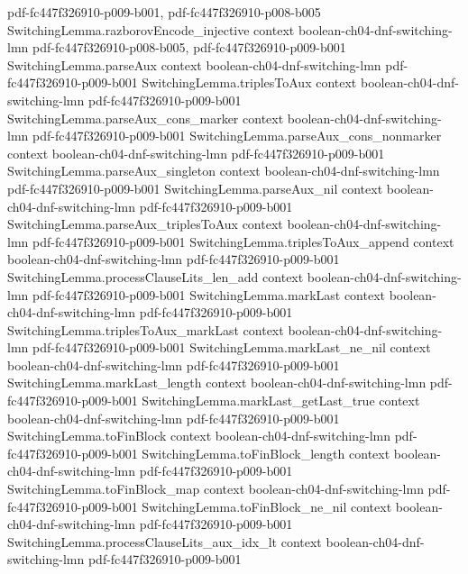 \begin{theorem}
  {pdf-fc447f326910-p009-b001,
    pdf-fc447f326910-p008-b005}
\proofstep
  {SwitchingLemma.razborovEncode_injective}
  {context}
  {boolean-ch04-dnf-switching-lmn}
  {pdf-fc447f326910-p008-b005,
    pdf-fc447f326910-p009-b001}
\proofstep
  {SwitchingLemma.parseAux}
  {context}
  {boolean-ch04-dnf-switching-lmn}
  {pdf-fc447f326910-p009-b001}
\proofstep
  {SwitchingLemma.triplesToAux}
  {context}
  {boolean-ch04-dnf-switching-lmn}
  {pdf-fc447f326910-p009-b001}
\proofstep
  {SwitchingLemma.parseAux_cons_marker}
  {context}
  {boolean-ch04-dnf-switching-lmn}
  {pdf-fc447f326910-p009-b001}
\proofstep
  {SwitchingLemma.parseAux_cons_nonmarker}
  {context}
  {boolean-ch04-dnf-switching-lmn}
  {pdf-fc447f326910-p009-b001}
\proofstep
  {SwitchingLemma.parseAux_singleton}
  {context}
  {boolean-ch04-dnf-switching-lmn}
  {pdf-fc447f326910-p009-b001}
\proofstep
  {SwitchingLemma.parseAux_nil}
  {context}
  {boolean-ch04-dnf-switching-lmn}
  {pdf-fc447f326910-p009-b001}
\proofstep
  {SwitchingLemma.parseAux_triplesToAux}
  {context}
  {boolean-ch04-dnf-switching-lmn}
  {pdf-fc447f326910-p009-b001}
\proofstep
  {SwitchingLemma.triplesToAux_append}
  {context}
  {boolean-ch04-dnf-switching-lmn}
  {pdf-fc447f326910-p009-b001}
\proofstep
  {SwitchingLemma.processClauseLits_len_add}
  {context}
  {boolean-ch04-dnf-switching-lmn}
  {pdf-fc447f326910-p009-b001}
\proofstep
  {SwitchingLemma.markLast}
  {context}
  {boolean-ch04-dnf-switching-lmn}
  {pdf-fc447f326910-p009-b001}
\proofstep
  {SwitchingLemma.triplesToAux_markLast}
  {context}
  {boolean-ch04-dnf-switching-lmn}
  {pdf-fc447f326910-p009-b001}
\proofstep
  {SwitchingLemma.markLast_ne_nil}
  {context}
  {boolean-ch04-dnf-switching-lmn}
  {pdf-fc447f326910-p009-b001}
\proofstep
  {SwitchingLemma.markLast_length}
  {context}
  {boolean-ch04-dnf-switching-lmn}
  {pdf-fc447f326910-p009-b001}
\proofstep
  {SwitchingLemma.markLast_getLast_true}
  {context}
  {boolean-ch04-dnf-switching-lmn}
  {pdf-fc447f326910-p009-b001}
\proofstep
  {SwitchingLemma.toFinBlock}
  {context}
  {boolean-ch04-dnf-switching-lmn}
  {pdf-fc447f326910-p009-b001}
\proofstep
  {SwitchingLemma.toFinBlock_length}
  {context}
  {boolean-ch04-dnf-switching-lmn}
  {pdf-fc447f326910-p009-b001}
\proofstep
  {SwitchingLemma.toFinBlock_map}
  {context}
  {boolean-ch04-dnf-switching-lmn}
  {pdf-fc447f326910-p009-b001}
\proofstep
  {SwitchingLemma.toFinBlock_ne_nil}
  {context}
  {boolean-ch04-dnf-switching-lmn}
  {pdf-fc447f326910-p009-b001}
\proofstep
  {SwitchingLemma.processClauseLits_aux_idx_lt}
  {context}
  {boolean-ch04-dnf-switching-lmn}
  {pdf-fc447f326910-p009-b001}

\end{theorem}
